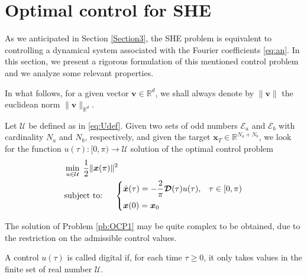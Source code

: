 \section{Optimal control for SHE}\label{Section4}

As we anticipated in Section \ref{Section3}, the SHE problem is equivalent to controlling a dynamical system associated with the Fourier coefficients \eqref{eq:an}. In this section, we present a rigorous formulation of this mentioned control problem and we analyze some relevant properties. 

In what follows, for a given vector $\bm{v}\in\mathbb{R}^d$, we shall always denote by $\|\bm{v}\|$ the euclidean norm $\|\bm{v}\|_{\mathbb{R}^d}$.
\newline


\begin{problem}\label{pb:OCP1}
Let $\mathcal U$ be defined as in \eqref{eq:Udef}. Given two sets of odd numbers $\mathcal {E}_a $ and $\mathcal {E}_b $ with cardinality $N_a$ and $N_b$, respectively, and given the target $\bm{x}_T\in \mathbb{R}^{N_a+N_b}$, we look for the function $u(\tau):[0,\pi)\to \mathcal U$ solution of the optimal control problem  
\begin{align*}
	&\min_{u \in \mathcal{U}}\;\frac 12 \|\bm{x}(\pi)\|^2
	\\
    &\notag \text{subject to: }\quad \begin{cases}
            \displaystyle \dot{\bm{x}}(\tau) = -\frac 2\pi\bm{\mathcal{D}}(\tau) u(\tau),  & \tau \in [0,\pi)\\[6pt]
            \bm{x}(0) = \bm{x}_0
    \end{cases}
    \end{align*}
\end{problem}
The solution of Problem \ref{pb:OCP1} may be quite complex to be obtained, due to the restriction on the admissible control values. 

\begin{definition}
A control $u(\tau)$ is called digital if, for each time $\tau\geq 0$, it only takes values in the finite set of real number $\mathcal{U}$.  
\end{definition}



